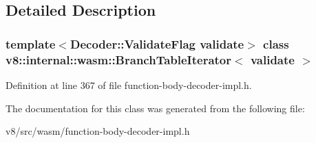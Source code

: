 \subsection{Detailed Description}
\subsubsection*{template$<$Decoder\+::\+Validate\+Flag validate$>$\newline
class v8\+::internal\+::wasm\+::\+Branch\+Table\+Iterator$<$ validate $>$}



Definition at line 367 of file function-\/body-\/decoder-\/impl.\+h.



The documentation for this class was generated from the following file\+:\begin{DoxyCompactItemize}
\item 
v8/src/wasm/function-\/body-\/decoder-\/impl.\+h\end{DoxyCompactItemize}
